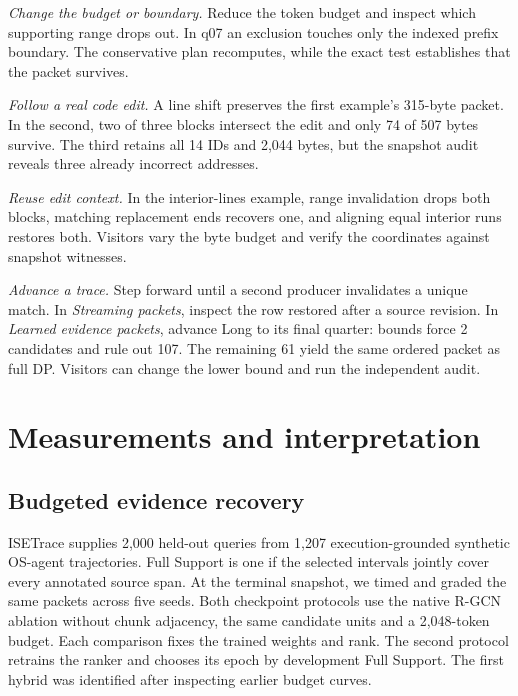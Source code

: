 \documentclass[conference]{IEEEtran}
\begin{document}
\textit{Change the budget or boundary.} Reduce the token budget and inspect which supporting range drops out. In q07 an exclusion touches only the indexed prefix boundary. The conservative plan recomputes, while the exact test establishes that the packet survives.

\textit{Follow a real code edit.} A line shift preserves the first example's 315-byte packet. In the second, two of three blocks intersect the edit and only 74 of 507 bytes survive. The third retains all 14 IDs and 2,044 bytes, but the snapshot audit reveals three already incorrect addresses. 

\textit{Reuse edit context.} In the interior-lines example, range invalidation drops both blocks, matching replacement ends recovers one, and aligning equal interior runs restores both. Visitors vary the byte budget and verify the coordinates against snapshot witnesses.

\textit{Advance a trace.} Step forward until a second producer invalidates a unique match. In \emph{Streaming packets}, inspect the row restored after a source revision. In \emph{Learned evidence packets}, advance Long to its final quarter: bounds force 2 candidates and rule out 107. The remaining 61 yield the same ordered packet as full DP. Visitors can change the lower bound and run the independent audit.

\section{Measurements and interpretation}
\subsection{Budgeted evidence recovery}
ISETrace supplies 2,000 held-out queries from 1,207 execution-grounded synthetic OS-agent trajectories. Full Support is one if the selected intervals jointly cover every annotated source span. At the terminal snapshot, we timed and graded the same packets across five seeds. Both checkpoint protocols use the native R-GCN ablation without chunk adjacency, the same candidate units and a 2,048-token budget. Each comparison fixes the trained weights and rank. The second protocol retrains the ranker and chooses its epoch by development Full Support. The first hybrid was identified after inspecting earlier budget curves.
\end{document}
